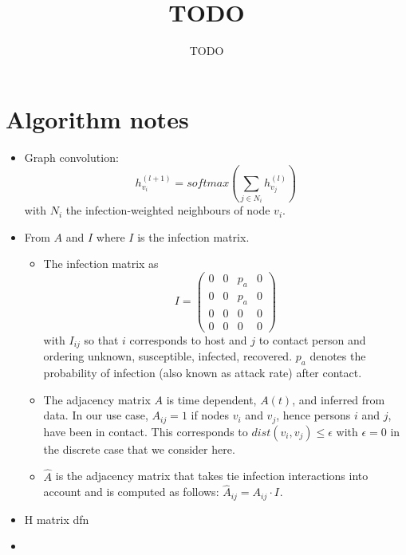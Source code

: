 \documentclass[]{article}
\title{TODO}
\author{TODO}
\begin{document}
\maketitle

\begin{abstract}

\end{abstract}

\section{Algorithm notes}

\begin{itemize}
	\item Graph convolution:
	\begin{equation}
		h_{v_i}^{(l+1)} = softmax(\sum_{j\in N_i} h_{v_j}^{(l)})
	\end{equation}
	with $N_i$ the infection-weighted neighbours of node $v_i$.
	\item From $A$ and $I$ where $I$ is the infection matrix.
	\begin{itemize}
		\item The infection matrix as
		\begin{equation}
			I =
			\begin{pmatrix}
				0 & 0 & p_a & 0 \\
				0 & 0 & p_a & 0 \\
				0 & 0 &  0  & 0 \\
				0 & 0 &  0  & 0
			\end{pmatrix}
		\end{equation}
		with $I_{ij}$ so that $i$ corresponds to host and $j$ to contact person and ordering unknown, susceptible, infected, recovered. $p_a$ denotes the probability of infection (also known as attack rate) after contact.
		\item The adjacency matrix $A$ is time dependent, $A(t)$, and inferred from data. In our use case, $A_{ij}=1$ if nodes $v_i$ and $v_j$, hence persons $i$ and $j$, have been in contact. This corresponds to $dist(v_i, v_j) \le \epsilon$ with $\epsilon=0$ in the discrete case that we consider here.
		\item $\hat{A}$ is the adjacency matrix that takes tie infection interactions into account and is computed as follows: $\hat{A}_{ij} = A_{ij}\cdot I_{}$.
	\end{itemize}
	\item H matrix dfn
	\item 
\end{itemize}
\end{document}
